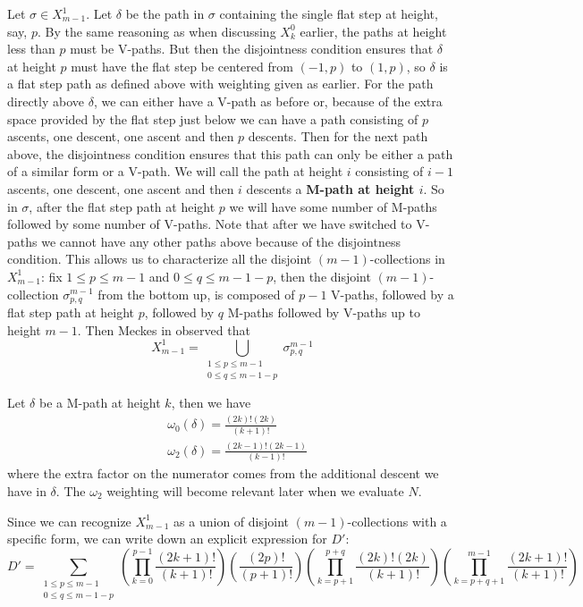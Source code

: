 \documentclass[11pt]{article}
\theoremstyle{definition}
\theoremstyle{definition}
\theoremstyle{plain}
\theoremstyle{plain}
\theoremstyle{plain}
\theoremstyle{definition}
\begin{document}
Let $\sigma\in X_{m-1}^1$. Let $\delta$ be the path in $\sigma$ containing the single flat step at height, say, $p$. By the same reasoning as when discussing $X_k^0$ earlier, the paths at height less than $p$ must be V-paths. But then the disjointness condition ensures that $\delta$ at height $p$ must have the flat step be centered from $(-1,p)$ to $(1,p)$, so $\delta$ is a flat step path as defined above with weighting given as earlier. For the path directly above $\delta$, we can either have a V-path as before or, because of the extra space provided by the flat step just below we can have a path consisting of $p$ ascents, one descent, one ascent and then $p$ descents. Then for the next path above, the disjointness condition ensures that this path can only be either a path of a similar form or a V-path. We will call the path at height $i$ consisting of $i-1$ ascents, one descent, one ascent and then $i$ descents a \textbf{M-path at height $i$}. So in $\sigma$, after the flat step path at height $p$ we will have some number of M-paths followed by some number of V-paths. Note that after we have switched to V-paths we cannot have any other paths above because of the disjointness condition. This allows us to characterize all the disjoint $(m-1)$-collections in $X_{m-1}^1$: fix $1\leq p\leq m-1$ and $0\leq q \leq m-1-p$, then the disjoint $(m-1)$-collection $\sigma_{p,q}^{m-1}$ from the bottom up, is composed of $p-1$ V-paths, followed by a flat step path at height $p$, followed by $q$ M-paths followed by V-paths up to height $m-1$. Then Meckes in \cite{meckes_magnitude_2019} observed that
\begin{equation*}
X_{m-1}^1 = \bigcup\limits_{\substack{1\leq p \leq m-1 \\ 0\leq q \leq m-1-p}} \sigma_{p,q}^{m-1}
\end{equation*}

Let $\delta$ be a M-path at height $k$, then we have
\begin{align*}
&\omega_0(\delta) = \frac{(2k)!(2k)}{(k+1)!} \\
&\omega_2(\delta) = \frac{(2k-1)!(2k-1)}{(k-1)!}
\end{align*}
where the extra factor on the numerator comes from the additional descent we have in $\delta$. The $\omega_2$ weighting will become relevant later when we evaluate $N$.

Since we can recognize $X_{m-1}^1$ as a union of disjoint $(m-1)$-collections with a specific form, we can write down an explicit expression for $D'$:
\begin{equation*}
D' = \sum\limits_{\substack{1\leq p\leq m-1\\0\leq q\leq m-1-p}}\left(\prod\limits_{k=0}^{p-1}\frac{(2k+1)!}{(k+1)!}\right)\left(\frac{(2p)!}{(p+1)!}\right)\left(\prod\limits_{k=p+1}^{p+q}\frac{(2k)!(2k)}{(k+1)!}\right)\left(\prod\limits_{k=p+q+1}^{m-1}\frac{(2k+1)!}{(k+1)!}\right)
\end{equation*}
\end{document}
